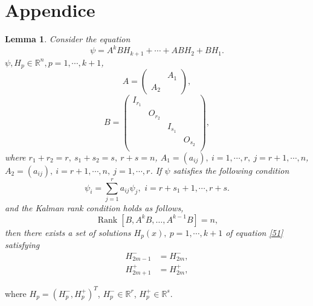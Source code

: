 \documentclass[a4paper,reqno,11pt]{amsart}
\numberwithin{equation}{section} %
\newtheorem{lem}{Lemma}[section]
\begin{document}
\section{Appendice}
\begin{lem}\label{l50}
	Consider the equation
	\begin{equation}\label{51}
		\psi =A^kBH_{k+1} +\cdots +ABH_2 +BH_1.
	\end{equation}
	$\psi , H_p \in \mathbb{R} ^n ,p = 1,\cdots,k+1$,
	$$
	A=\left(\begin{array}{ll} 
		& A_1 \\
		A_2 &
	\end{array}\right),
	$$
	$$
	B=\left( \begin{matrix}
		I_{r_1}&		&		&		\\
		&		O_{r_2}&		&		\\
		&		&		I_{s_1}&		\\
		&		&		&		O_{s_2}\\
	\end{matrix} \right) ,
	$$
	where $r_1 +r_2 =r,\ s_1+s_2=s,\ r+s=n $, $A_1=\left( a_{ij} \right) ,\ i=1,\cdots ,r,\ j=r+1,\cdots ,n$, $A_2=\left( a_{ij} \right) ,\ i=r+1,\cdots ,n,\ j=1,\cdots ,r$. 
  If $\psi$ satisfies the following condition
	\begin{equation}\label{52}
		\psi _i=\sum_{j=1}^r{a_{ij}\psi _j ,\,\,i=r+s_1+1,\cdots ,r+s.}
	\end{equation}
	and the Kalman rank condition holds as follows,
	\begin{equation}\label{53}
		\operatorname{Rank}\left[B, A^k B, \ldots, A^{k-1} B\right]=n,
	\end{equation}
	then there exists a set of solutions $H_p (x),\ p = 1, \cdots , k+1$ of equation \eqref{51} satisfying
	\begin{align}
		H^{-}_{2m-1} &= H^{-}_{2m}\label{55} ,\\
		H^{+}_{2m+1} &= H^{+}_{2m}\label{56} ,
	\end{align}
\end{lem}
where $H_p =\left( H^{-}_p ,H^{+}_p \right) ^T$, $H^{-}_p \in \mathbb{R} ^r$, $H^{+}_p \in \mathbb{R} ^s$.
\end{document}
